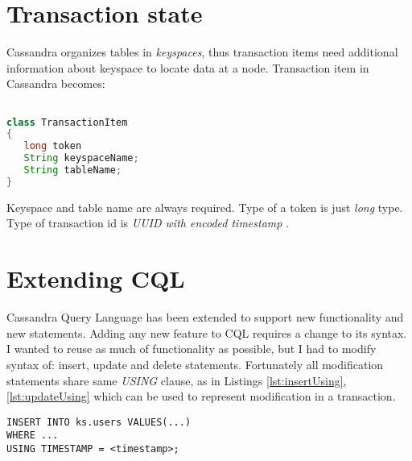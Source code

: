 \section{Transaction state}
Cassandra organizes tables in \emph{keyspaces}, thus transaction items need additional information about keyspace to locate data at a node. Transaction item in Cassandra becomes:

\begin{lstlisting}[language=Java,style=outcode,label={lst:txState},caption={Transaction item in Cassandra}]

class TransactionItem
{
   long token
   String keyspaceName;
   String tableName;
}
\end{lstlisting}

Keyspace and table name are always required. Type of a token is just \emph{long} type. Type of transaction id is \emph{UUID with encoded timestamp} \cite{CassandraUUID}.


\section{Extending CQL}
Cassandra Query Language has been extended to support new functionality and new statements. Adding any new feature to CQL requires a change to its syntax. I wanted to reuse as much of functionality as possible, but I had to modify syntax of: insert, update and delete statements. Fortunately all modification statements share same \emph{USING} clause, as in Listings \ref{lst:insertUsing},  \ref{lst:updateUsing} which can be used to represent modification in a transaction.


\begin{lstlisting}[style=outcode,label={lst:insertUsing},caption={Insert statement with using clause}]
INSERT INTO ks.users VALUES(...) 
WHERE ... 
USING TIMESTAMP = <timestamp>;
\end{lstlisting}

